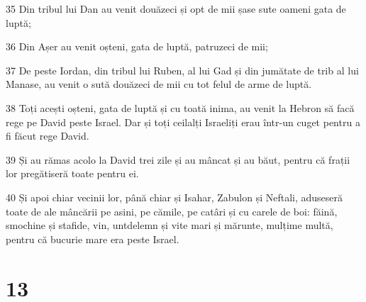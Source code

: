 \par 35 Din tribul lui Dan au venit douăzeci și opt de mii șase sute oameni gata de luptă;
\par 36 Din Așer au venit oșteni, gata de luptă, patruzeci de mii;
\par 37 De peste Iordan, din tribul lui Ruben, al lui Gad și din jumătate de trib al lui Manase, au venit o sută douăzeci de mii cu tot felul de arme de luptă.
\par 38 Toți acești oșteni, gata de luptă și cu toată inima, au venit la Hebron să facă rege pe David peste Israel. Dar și toți ceilalți Israeliți erau într-un cuget pentru a fi făcut rege David.
\par 39 Și au rămas acolo la David trei zile și au mâncat și au băut, pentru că frații lor pregătiseră toate pentru ei.
\par 40 Și apoi chiar vecinii lor, până chiar și Isahar, Zabulon și Neftali, aduseseră toate de ale mâncării pe asini, pe cămile, pe catâri și cu carele de boi: făină, smochine și stafide, vin, untdelemn și vite mari și mărunte, mulțime multă, pentru că bucurie mare era peste Israel.

\chapter{13}

